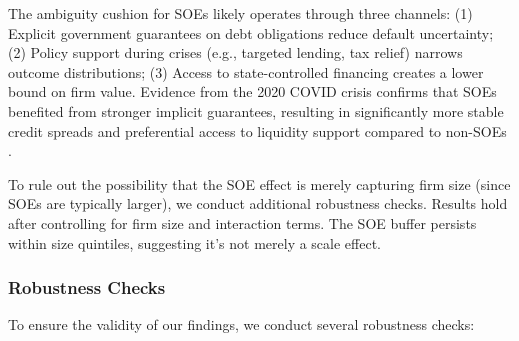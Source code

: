\documentclass[preprint,12pt,authoryear]{elsarticle}
\begin{document}
 The ambiguity cushion for SOEs likely operates through three channels: (1) Explicit government guarantees on debt obligations reduce default uncertainty; (2) Policy support during crises (e.g., targeted lending, tax relief) narrows outcome distributions; (3) Access to state-controlled financing creates a lower bound on firm value. Evidence from the 2020 COVID crisis confirms that SOEs benefited from stronger implicit guarantees, resulting in significantly more stable credit spreads and preferential access to liquidity support compared to non-SOEs \citep{Geng2024}.
  
  To rule out the possibility that the SOE effect is merely capturing firm size (since SOEs are typically larger), we conduct additional robustness checks. Results hold after controlling for firm size and interaction terms. The SOE buffer persists within size quintiles, suggesting it's not merely a scale effect.

\subsubsection{Robustness Checks}
\label{sec:robustness}

To ensure the validity of our findings, we conduct several robustness checks:
\end{document}
